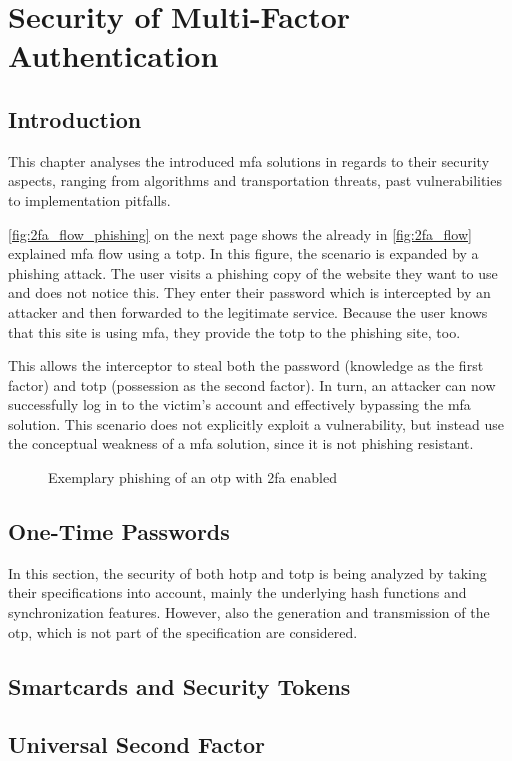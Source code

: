 \chapter{Security of Multi-Factor Authentication}

\section{Introduction}

This chapter analyses the introduced \gls{mfa} solutions in regards to their security aspects, ranging from algorithms and transportation threats, past vulnerabilities to implementation pitfalls.

\autoref{fig:2fa_flow_phishing} on the next page shows the already in \autoref{fig:2fa_flow} explained \gls{mfa} flow using a \gls{totp}. In this figure, the scenario is expanded by a phishing attack. The user visits a phishing copy of the website they want to use and does not notice this. They enter their password which is intercepted by an attacker and then forwarded to the legitimate service. Because the user knows that this site is using \gls{mfa}, they provide the \gls{totp} to the phishing site, too.

This allows the interceptor to steal both the password (knowledge as the first factor) and \gls{totp} (possession as the second factor). In turn, an attacker can now successfully log in to the victim's account and effectively bypassing the \gls{mfa} solution. This scenario does not explicitly exploit a vulnerability, but instead use the conceptual weakness of a \gls{mfa} solution, since it is not phishing resistant.

\newpage

\begin{figure}[hbt]
	\centering
	
	\caption[Exemplary phishing of an \gls{otp} with \gls{2fa} enabled]{Exemplary phishing of an \gls{otp} with \gls{2fa} enabled\footnotemark}
	\label{fig:2fa_flow_phishing}
\end{figure}

\section{One-Time Passwords}
\label{sec:totp_sec}

In this section, the security of both \gls{hotp} and \gls{totp} is being analyzed by taking their specifications into account, mainly the underlying hash functions and synchronization features. However, also the generation and transmission of the \gls{otp}, which is not part of the specification are considered.



\section{Smartcards and Security Tokens}
\label{sec:tokens}



\section{Universal Second Factor}
\label{sec:u2f}


